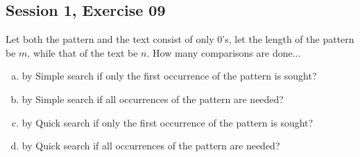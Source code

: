 \subsection{Session 1, Exercise 09}


Let both the pattern and the text consist of only $0$'s, let the length of the pattern be $m$, while that of the text be $n$. How many comparisons are done...

\begin{enumerate}[a.)]
    \item by Simple search if only the first occurrence of the pattern is sought?
    \item by Simple search if all occurrences of the pattern are needed?
    \item by Quick search if only the first occurrence of the pattern is sought?
    \item by Quick search if all occurrences of the pattern are needed?
\end{enumerate}

